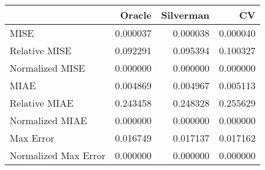 \begin{tabular}{lrrr}
  \hline
 & Oracle & Silverman & CV \\ 
  \hline
MISE & 0.000037 & 0.000038 & 0.000040 \\ 
  Relative MISE & 0.092291 & 0.095394 & 0.100327 \\ 
  Normalized MISE & 0.000000 & 0.000000 & 0.000000 \\ 
  MIAE & 0.004869 & 0.004967 & 0.005113 \\ 
  Relative MIAE & 0.243458 & 0.248328 & 0.255629 \\ 
  Normalized MIAE & 0.000000 & 0.000000 & 0.000000 \\ 
  Max Error & 0.016749 & 0.017137 & 0.017162 \\ 
  Normalized Max Error & 0.000000 & 0.000000 & 0.000000 \\ 
   \hline
\end{tabular}
